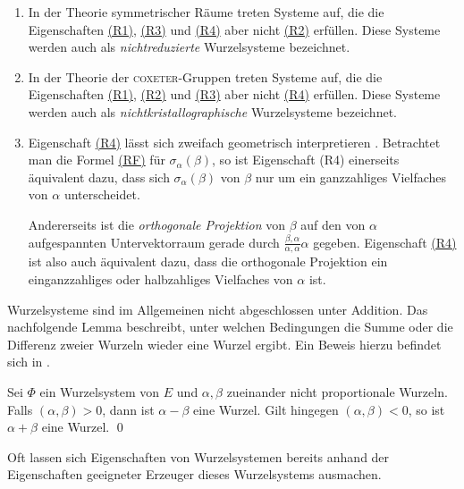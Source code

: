 \begin{bem}
  \begin{enumerate}
    \item In der Theorie symmetrischer Räume treten Systeme auf, die die Eigenschaften \hyperref[it:R1]{(R1)}, \hyperref[it:R3]{(R3)} und \hyperref[it:R4]{(R4)} aber nicht \hyperref[it:R2]{(R2)} erfüllen. 
      Diese Systeme werden auch als \emph{nichtreduzierte} Wurzelsysteme bezeichnet.
    \item In der Theorie der \textsc{coxeter}\hyp{}Gruppen treten Systeme auf, die die Eigenschaften \hyperref[it:R1]{(R1)}, \hyperref[it:R2]{(R2)} und \hyperref[it:R3]{(R3)} aber nicht \hyperref[it:R4]{(R4)} erfüllen.
      Diese Systeme werden auch als \emph{nichtkristallographische} Wurzelsysteme bezeichnet.
    \item Eigenschaft \hyperref[it:R4]{(R4)} lässt sich zweifach geometrisch interpretieren \cite[S.198]{hall2015lie}.
      Betrachtet man die Formel \hyperref[eq:RF]{\hyperref[it:RF]{(RF)}} für $\sigma_\alpha(\beta)$, so ist Eigenschaft (R4) einerseits äquivalent dazu, dass sich $\sigma_\alpha(\beta)$ von $\beta$ nur um ein ganzzahliges Vielfaches von $\alpha$ unterscheidet.

      Andererseits ist die \emph{orthogonale Projektion} von $\beta$ auf den von $\alpha$ aufgespannten Untervektorraum gerade durch $\tfrac{\beta,\alpha}{\alpha,\alpha}\alpha$ gegeben.
      Eigenschaft \hyperref[it:R4]{(R4)} ist also auch äquivalent dazu, dass die orthogonale Projektion ein einganzzahliges oder halbzahliges Vielfaches von $\alpha$ ist.
  \end{enumerate}
\end{bem}

Wurzelsysteme sind im Allgemeinen nicht abgeschlossen unter Addition. 
Das nachfolgende Lemma beschreibt, unter welchen Bedingungen die Summe oder die Differenz zweier Wurzeln wieder eine Wurzel ergibt. Ein Beweis hierzu befindet sich in \cite[S.45]{humphreys1972introduction}.

\begin{lem}
  \label{lem:sumDiffRoot}
  Sei $\Phi$ ein Wurzelsystem von $E$ und $\alpha, \beta$ zueinander nicht proportionale Wurzeln.
  Falls $(\alpha, \beta) > 0$, dann ist $\alpha - \beta$ eine Wurzel.
  Gilt hingegen $(\alpha, \beta) < 0$, so ist $\alpha + \beta$ eine Wurzel. \qed
\end{lem}

Oft lassen sich Eigenschaften von Wurzelsystemen bereits anhand der Eigenschaften geeigneter Erzeuger dieses Wurzelsystems ausmachen.

